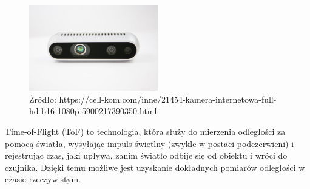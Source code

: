 \documentclass[magisterska]{pracadypl}
\begin{document}
\begin{figure}[h]  %
    \centering  %
    \includegraphics[width=0.5\textwidth]{images/TOF-IR.jpg}  %
    \captionsetup{labelformat=empty, font=footnotesize}
    \caption{Źródło: https://cell-kom.com/inne/21454-kamera-internetowa-full-hd-b16-1080p-5900217390350.html}
    \label{fig:mono}  %
\end{figure}

Time-of-Flight (ToF) to technologia, która służy do mierzenia odległości za pomocą światła, wysyłając impuls świetlny (zwykle w postaci podczerwieni) i rejestrując czas, jaki upływa, zanim światło odbije się od obiektu i wróci do czujnika. Dzięki temu możliwe jest uzyskanie dokładnych pomiarów odległości w czasie rzeczywistym.
\end{document}
